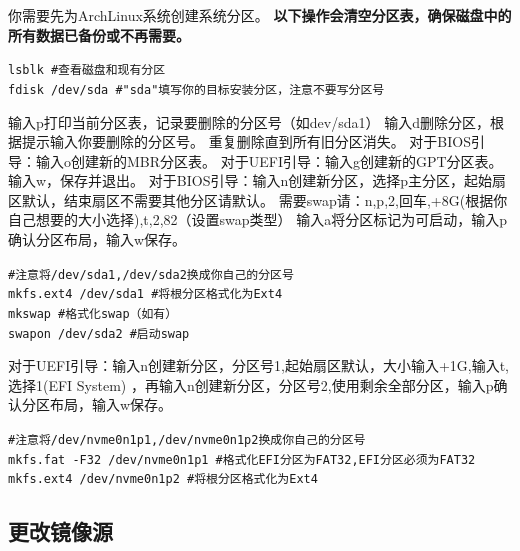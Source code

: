 \documentclass{article}
\newenvironment{singlecolumn}{
	\par
	\noindent
	\begin{minipage}[t]{\textwidth} 
		\setlength{\parfillskip}{0pt plus 1fil} 
	}{%
	\end{minipage}
	\par
}
\begin{document}
\begin{singlecolumn}
你需要先为ArchLinux系统创建系统分区。 
\textcolor{code}{\textbf{以下操作会清空分区表，确保磁盘中的所有数据已备份或不再需要。} }
\begin{tcolorbox}[
	title=bash,
	boxrule=1pt,
	fonttitle=\bfseries,
	listing only, 
	listing options={language=bash}
	]
	\verb|lsblk #查看磁盘和现有分区|\\
	\verb|fdisk /dev/sda #"sda"填写你的目标安装分区，注意不要写分区号|\\
\end{tcolorbox}
输入p打印当前分区表，记录要删除的分区号（如dev/sda1）
输入d删除分区，根据提示输入你要删除的分区号。
重复删除直到所有旧分区消失。
\textcolor{bios}{对于BIOS引导：输入o创建新的MBR分区表。}
\textcolor{uefi}{对于UEFI引导：输入g创建新的GPT分区表。}
输入\textcolor{code}{w}，保存并退出。
\textcolor{bios}{对于BIOS引导：输入n创建新分区，选择p主分区，起始扇区默认，结束扇区不需要其他分区请默认。
需要swap请：\textcolor{code}{n,p,2,回车,+8G(根据你自己想要的大小选择),t,2,82（设置swap类型）
输入a将分区标记为可启动，输入p确认分区布局，输入w保存。}}\\
\begin{tcolorbox}[
	title=bash,
	boxrule=1pt,
	fonttitle=\bfseries,
	listing only, 
	listing options={language=bash}
	]
	\verb|#注意将/dev/sda1,/dev/sda2换成你自己的分区号|\\
	\verb|mkfs.ext4 /dev/sda1 #将根分区格式化为Ext4|\\
	\verb|mkswap #格式化swap（如有）|\\
	\verb|swapon /dev/sda2 #启动swap|\\
\end{tcolorbox}
\textcolor{uefi}{对于UEFI引导：输入n创建新分区，分区号1,起始扇区默认，大小输入+1G,输入t,选择1(EFI System) ，再输入n创建新分区，分区号2,使用剩余全部分区，输入p确认分区布局，输入w保存。}\\
\begin{tcolorbox}[
	title=bash,
	boxrule=1pt,
	fonttitle=\bfseries,
	listing only, 
	listing options={language=bash}
	]
	\verb|#注意将/dev/nvme0n1p1,/dev/nvme0n1p2换成你自己的分区号|\\
	\verb|mkfs.fat -F32 /dev/nvme0n1p1 #格式化EFI分区为FAT32,EFI分区必须为FAT32|\\
	\verb|mkfs.ext4 /dev/nvme0n1p2 #将根分区格式化为Ext4|\\
\end{tcolorbox}

\medskip

\begin{tcolorbox}
\section*{更改镜像源}
\end{tcolorbox}


\end{singlecolumn}
\end{document}
